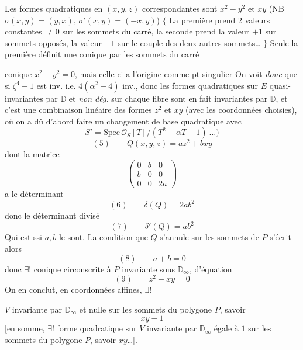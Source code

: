 \documentclass[11pt,a4paper]{article}
\begin{document}
Les formes quadratiques en $(x,y,z)$ correspondantes sont $x^2 - y^2$  et $xy$ (NB $\sigma(x,y) = (y,x)$, $\sigma'(x,y) = (-x, y)$)
 $\{$ La première prend 2 valeurs constantes $\neq 0$ sur les sommets du carré, la seconde prend la valeur $+1$ sur   sommets opposés, la valeur $-1$ sur le couple des deux autres sommets… $\}$ Seule la première définit une conique \ill{}  par les sommets du carré 

conique $x^2 - y^2 = 0$, mais celle-ci a l'origine comme pt singulier 
On voit \emph{donc} que si $\zeta^{4} - 1$ est inv. i.e. $4(\alpha^2 - 4)$ inv., donc \struck{\ill{}} les formes quadratiques sur $E$ quasi-invariantes par $\mathbb{D}$ et \emph{non dég.} sur chaque fibre sont en fait invariantes par $\mathbb{D}$, et c'est une combinaison linéaire des formes $z^2$ et $xy$ (avec les coordonnées choisies), \struck{\ill{}} où on a dû d'abord faire un changement de base quadratique avec
\[
  S' = \mathrm{Spec}\, \mathcal{O}_S[T]/(T^2 - \alpha T + 1)\ \ldots)
\]
\[
  (5) \qquad Q(x,y,z) = a z^2 + b xy
\]
dont la  matrice
\[
  \begin{pmatrix} 0 & b & 0 \\ b & 0 & 0 \\ 0 & 0 & 2a \end{pmatrix}
\]
a le déterminant
\[
  (6) \qquad \delta(Q) = 2ab^2
\]
donc le déterminant divisé
\[
  (7) \qquad \delta'(Q) = ab^2
\]
Qui est   ssi $a, b$ le sont. La condition que $Q$ s'annule sur les sommets de $P$ s'écrit alors
\[
  (8) \qquad a + b = 0
\]
donc $\exists !$ \struck{\ill{}} conique circonscrite à $P$ invariante sous $\mathbb{D}_\infty$, \struck{\ill{}} d'équation
\[
  (9) \qquad z^2 - xy = 0
\]
On en conclut, en coordonnées affines, $\exists !$

    $V$ invariante par $\mathbb{D}_\infty$ et \struck{\ill{}} nulle sur les sommets du polygone $P$, savoir
\[
  xy - 1
\]
[en somme, $\exists !$ forme quadratique sur $V$ invariante par $\mathbb{D}_\infty$ égale à $1$ sur les sommets du polygone $P$, savoir $xy$…].
\end{document}
